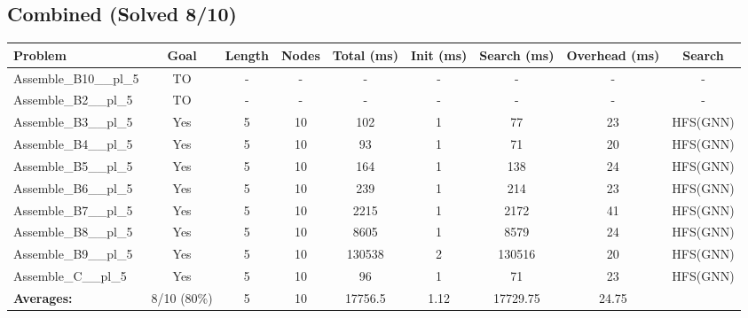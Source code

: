 \documentclass{article}
\begin{document}
\subsection*{Combined (Solved 8/10)}
\begin{tabular}{lcccccccc}
\toprule
Problem & Goal & Length & Nodes & Total (ms) & Init (ms) & Search (ms) & Overhead (ms) & Search \\
\midrule
Assemble\_B10\_\_pl\_5 & TO & - & - & - & - & - & - & - \\
Assemble\_B2\_\_pl\_5 & TO & - & - & - & - & - & - & - \\
Assemble\_B3\_\_pl\_5 & Yes & 5 & 10 & 102 & 1 & 77 & 23 & HFS(GNN) \\
Assemble\_B4\_\_pl\_5 & Yes & 5 & 10 & 93 & 1 & 71 & 20 & HFS(GNN) \\
Assemble\_B5\_\_pl\_5 & Yes & 5 & 10 & 164 & 1 & 138 & 24 & HFS(GNN) \\
Assemble\_B6\_\_pl\_5 & Yes & 5 & 10 & 239 & 1 & 214 & 23 & HFS(GNN) \\
Assemble\_B7\_\_pl\_5 & Yes & 5 & 10 & 2215 & 1 & 2172 & 41 & HFS(GNN) \\
Assemble\_B8\_\_pl\_5 & Yes & 5 & 10 & 8605 & 1 & 8579 & 24 & HFS(GNN) \\
Assemble\_B9\_\_pl\_5 & Yes & 5 & 10 & 130538 & 2 & 130516 & 20 & HFS(GNN) \\
Assemble\_C\_\_pl\_5 & Yes & 5 & 10 & 96 & 1 & 71 & 23 & HFS(GNN) \\
\textbf{Averages:} & 8/10 (80\%) & 5 & 10 & 17756.5 & 1.12 & 17729.75 & 24.75 & \\
\bottomrule
\end{tabular}
\\[0.7cm]
\end{document}
